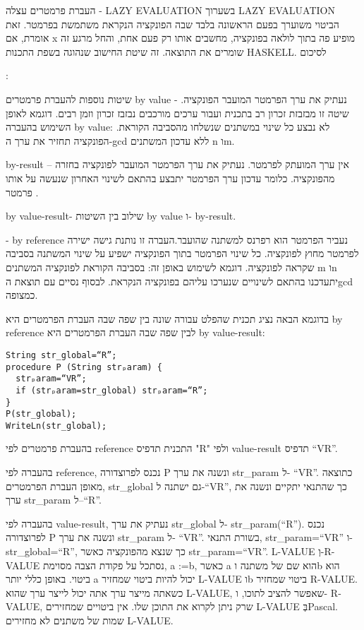         העברת פרמטרים עצלה - LAZY EVALUATION
        בשערוך LAZY EVALUATION הביטוי משוערך בפעם הראשונה בלבד שבה הפונקציה הנקראת משתמשת בפרמטר.
        זאת אומרת, אם x מופיע פה בתוך לולאה בפונקציה, מחשבים אותו רק פעם אחת, והחל מרגע זה שומרים את התוצאה. זה שיטת החישוב שנהוגה בשפת התכנות HASKELL.
        לסיכום

        :

        שיטות נוספות להעברת פרמטרים
        by value - נעתיק את ערך הפרמטר המועבר הפונקציה. שיטה זו מבזבזת זכרון רב בתכנית ועבור ערכים מורכבים נבזבז זכרון וזמן רבים.
        דוגמא לאופן השימוש בהעברה by value:
        לא נבצע כל שינוי במשתנים שנשלחו מהסביבה הקוראת.
        הפונקציה תחזיר את ערך ה-gcd ללא עדכון המשתנים n וm.

        by-result – אין ערך המועתק לפרמטר. נעתיק את ערך הפרמטר המועבר לפונקציה בחזרה מהפונקציה. כלומר עדכון ערך הפרמטר יתבצע בהתאם לשינוי האחרון שנעשה על אותו פרמטר .

        by value-result- שילוב בין השיטות by value ו- by-result.

        - by reference נעביר הפרמטר הוא רפרנס למשתנה שהועבר.העברה זו נותנת גישה ישירה לפרמטר מחוץ לפונקציה. כל שינוי הפרמטר בתוך הפונקציה ישפיע על שינוי המשתנה בסביבה שקראה לפונקציה.
        דוגמא לשימוש באופן זה:
        בסביבה הקוראת לפונקציה המשתנים m וn יתעדכנו בהתאם לשינויים שנערכו עליהם בפונקציה הנקראת.
        לבסוף נסיים עם תוצאת הgcd כמצופה.

        בדוגמא הבאה נציג תכנית שהפלט עבורה שונה בין שפה שבה העברת הפרמטרים היא by reference לבין שפה שבה העברת הפרמטרים היא by value-result:
\begin{verbatim}
String str_global=“R”;
procedure P (String strₚaram) {
  strₚaram=“VR”;
  if (strₚaram=str_global) strₚaram=“R”;
}
P(str_global);
WriteLn(str_global);
\end{verbatim}
        בהעברת פרמטרים לפי reference התכנית תדפיס "R" ולפי value-result תדפיס “VR”.

        בהעברה לפי reference, נכנס לפרוצדורה P ונשנה את ערך str\_param ל- “VR”. כתוצאה מאופן העברת הפרמטרים, str\_global גם ישתנה ל-“VR”, כך שהתנאי יתקיים ונשנה את ערך str\_param ל--“R”.

        בהעברה לפי value-result, נעתיק את ערך str\_global ל- str\_param(“R”).
        נכנס לפרוצדורה P ונשנה את ערך str\_param ל- “VR”.
        בשורת התנאי, str\_param=“VR” ו- str\_global=“R”, כך שנצא מהפונקציה כאשר str\_param=“VR”.
        L-VALUE וְ-R-VALUE
        נסתכל על פקודת הצבה מסוימת, a :=b, כאשר a הוא שם של משתנה וb הוא ביטוי.
        באופן כללי יותר a יכול להיות ביטוי שמחזיר L-VALUE וb ביטוי שמחזיר R-VALUE.
        כשאתה מייצר ערך אתה יכול לייצר ערך שהוא L-VALUE, שאפשר להציב לתוכו, ו- R-VALUE, שרק ניתן לקרוא את התוכן שלו.
        אין ביטויים שמחזירים L-VALUE בְּPascal. שמות של משתנים לא מחזירים L-VALUE.


